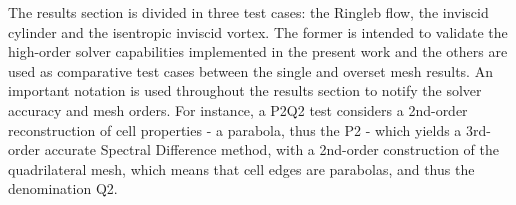 The results section is divided in three test cases: the Ringleb flow, the inviscid cylinder and the isentropic inviscid vortex. The former is intended to validate the high-order solver capabilities implemented in the present work and the others are used as comparative test cases between the single and overset mesh results. An important notation is used throughout the results section to notify the solver accuracy and mesh orders. For instance, a P2Q2 test considers a 2nd-order reconstruction of cell properties - a parabola, thus the P2 - which yields a 3rd-order accurate Spectral Difference method, with a 2nd-order construction of the quadrilateral mesh, which means that cell edges are parabolas, and thus the denomination Q2. 

